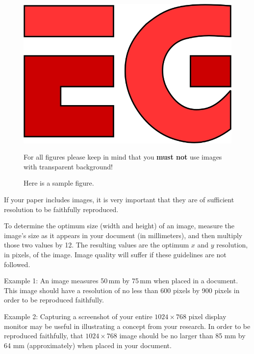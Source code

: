 \documentclass{egpubl}
\begin{document}
	\begin{figure}[htb]
		\centering
		\includegraphics[width=.8\linewidth]{sampleFig}
		\parbox[t]{.9\columnwidth}{\relax
			For all figures please keep in mind that you \textbf{must not}
			use images with transparent background! 
		}
		\caption{\label{fig:firstExample}
			Here is a sample figure.}
	\end{figure}
	
	If your paper includes images, it is very important that they are of
	sufficient resolution to be faithfully reproduced.
	
	To determine the optimum size (width and height) of an image, measure
	the image's size as it appears in your document (in millimeters), and
	then multiply those two values by 12. The resulting values are the
	optimum $x$ and $y$ resolution, in pixels, of the image. Image quality
	will suffer if these guidelines are not followed.
	
	Example 1: 
	An image measures 50\,mm by 75\,mm when placed in a document. This
	image should have a resolution of no less than 600 pixels by 900
	pixels in order to be reproduced faithfully.
	
	Example 2: 
	Capturing a screenshot of your entire $1024 \times 768$ pixel display
	monitor may be useful in illustrating a concept from your research. In
	order to be reproduced faithfully, that $1024 \times 768$ image should
	be no larger than 85 mm by 64 mm (approximately) when placed in your
	document.
	
\end{document}
